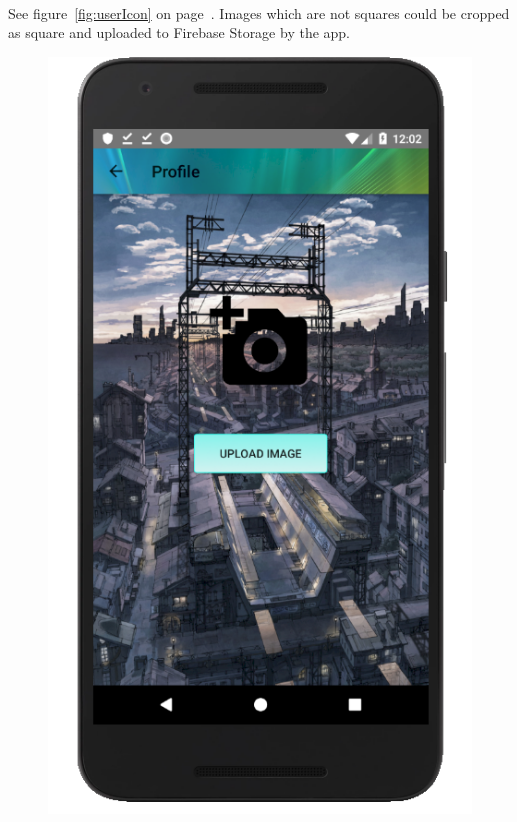 \documentclass[12pt]{article}
\begin{document}
\paragraph{}
See figure~\ref{fig:userIcon} on page~\pageref{fig:userIcon}. Images which are not squares could be cropped as square and uploaded to Firebase Storage by the app.
\begin{figure}
	\centering
	\includegraphics[scale=0.25]{UserIconActivity.png}

\end{figure}
\end{document}

